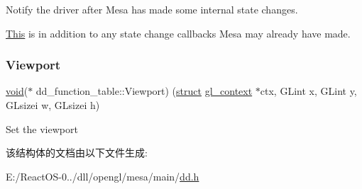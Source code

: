 Notify the driver after Mesa has made some internal state changes.

\hyperlink{namespace_this}{This} is in addition to any state change callbacks Mesa may already have made. \mbox{\label{structdd__function__table_a02346107e5bca25525b75b729b4bac51}} 
\subsubsection{\texorpdfstring{Viewport}{Viewport}}
{\footnotesize\ttfamily \hyperlink{interfacevoid}{void}($\ast$ dd\+\_\+function\+\_\+table\+::\+Viewport) (\hyperlink{interfacestruct}{struct} \hyperlink{structgl__context}{gl\+\_\+context} $\ast$ctx, G\+Lint x, G\+Lint y, G\+Lsizei w, G\+Lsizei h)}

Set the viewport 

该结构体的文档由以下文件生成\+:\begin{DoxyCompactItemize}
\item 
E\+:/\+React\+O\+S-\/0../dll/opengl/mesa/main/\hyperlink{dd_8h}{dd.\+h}\end{DoxyCompactItemize}

